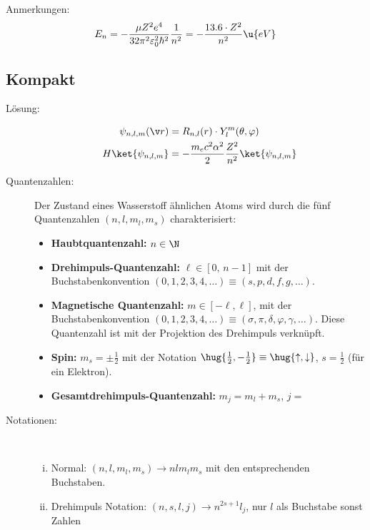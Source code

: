 \documentclass[twocolumn]{summery_4.1}
\begin{document}
Anmerkungen:
\begin{align*}
    E_n = -\frac{\mu Z^2 e^4}{32 \pi^2 \varepsilon_0^2 \hbar^2} \frac{1}{n^2} = - \frac{13.6\cdot Z^2}{n^2} \u{eV}
\end{align*}

\subsection{Kompakt} 
\begin{description}
    \item[Lösung:]
    \begin{align*}
        \psi_{n,l,m}(\v r) &= R_{n,l}(r)\cdot Y_l^m(\theta,\varphi)\\
        H \ket {\psi_{n,l,m}} &= -\frac{m_e c^2 \alpha^2}{2}\frac{Z^2}{n^2}\ket{\psi_{n,l,m}}
    \end{align*}
    \item[Quantenzahlen:]
    Der Zustand eines Wasserstoff ähnlichen Atoms wird durch die fünf Quantenzahlen $(n,l,m_l,m_s)$ charakterisiert:
    \begin{itemize}
        \item {\bf Haubtquantenzahl:} \(
            n\in\N\)
        \item {\bf Drehimpuls-Quantenzahl:} \(\ell\in[0,\,n-1]\)
        mit der Buchstabenkonvention \((0,1,2,3,4,\dots)\equiv (s,p,d,f,g,\dots)\). 
        \item {\bf Magnetische Quantenzahl:} \(m\in[-\ell,\ell]\), mit der Buchstabenkonvention
        \((0,1,2,3,4,\dots)\equiv (\sigma, \pi, \delta, \varphi, \gamma,\dots )\).
        Diese Quantenzahl ist mit der Projektion des Drehimpuls verknüpft.
        \item {\bf Spin:} \(m_s = \pm \frac12\) mit der Notation \(\hug{\frac12, -\frac12}\equiv \hug{\uparrow, \downarrow}\), \(s = \frac12\) (für ein Elektron). 
        \item {\bf Gesamtdrehimpuls-Quantenzahl:} \(m_j = m_l + m_s\), \(j=\)
    \end{itemize} 

    \item[Notationen:]\,

        \begin{enumerate}[(i)]
            \item Normal: \((n,l,m_l,m_s) \to nlm_lm_s\) mit den entsprechenden Buchstaben.
            \item Drehimpuls Notation: \((n,s,l,j)\to n^{2s+1}l_j\), nur \(l\) als Buchstabe sonst Zahlen
        \end{enumerate}
\end{description}
\end{document}

